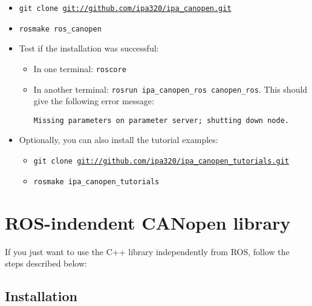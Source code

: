   \begin{itemize}
  \item \texttt{git clone \url{git://github.com/ipa320/ipa_canopen.git}}
  \item \texttt{rosmake ros\_canopen} 
  \item Test if the installation was successful:
    \begin{itemize}
    \item In one terminal: \texttt{roscore}
    \item In another terminal: \texttt{rosrun ipa\_canopen\_ros canopen\_ros}. This should give the following error message:
      {\scriptsize
\begin{verbatim}Missing parameters on parameter server; shutting down node.\end{verbatim}}
\end{itemize}
\item Optionally, you can also install the tutorial examples:
\begin{itemize}
\item \texttt{git clone \url{git://github.com/ipa320/ipa_canopen_tutorials.git}}
\item \texttt{rosmake ipa\_canopen\_tutorials}
\end{itemize}

\end{itemize}


 \section{ROS-indendent CANopen library}
\label{chap:installation:ipa_canopen_core}

If you just want to use the C++ library independently from ROS, follow the steps described below:

\subsection{Installation}

